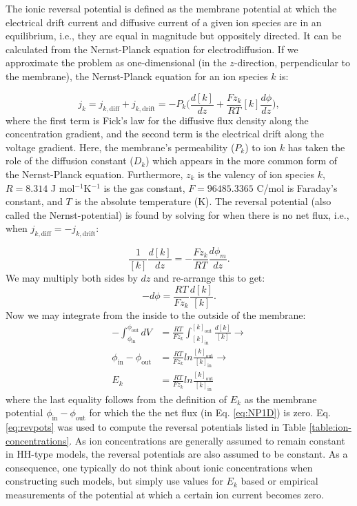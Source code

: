 The ionic reversal potential is defined as the membrane potential at which the electrical drift current and diffusive current of a given ion species are in an equilibrium, i.e., they are equal in magnitude but oppositely directed. It can be calculated from the Nernst-Planck equation for electrodiffusion. If we approximate the problem as one-dimensional (in the $z$-direction, perpendicular to the membrane), the Nernst-Planck equation for an ion species $k$ is:

\begin{equation}
j_k = j_{k,\text{diff}} + j_{k,\text{drift}} 
=  - P_k \Big(\frac{d[k]}{dz} +  \frac{Fz_k}{RT}  [k] \frac{d\phi}{dz} \Big), 
\label{eq:NP1D}
\end{equation}
where the first term is Fick's law for the diffusive flux density along the concentration gradient, and the second term is the electrical drift along the voltage gradient. Here, the membrane's permeability ($P_k$) to ion $k$ has taken the role of the diffusion constant ($D_k$) which appears in the more common form of the Nernst-Planck equation. Furthermore, $z_{k}$ is the valency of ion species $k$, $R = 8.314$ J mol$^{-1}$K$^{-1}$ is the gas constant, $F = 96485.3365$ C/mol is Faraday's constant, and $T$ is the absolute temperature (K). The reversal potential (also called the Nernst-potential) is found by solving for when there is no net flux, i.e., when  $j_{k,\text{diff}} = - j_{k,\text{drift}}$:

\begin{equation}
\frac{1}{[k]} \frac{d[k]}{dz} = - \frac{Fz_k}{RT}  \frac{d\phi_m}{dz}.
\end{equation}
We may multiply both sides by $dz$ and re-arrange this to get:
\begin{equation}
-d\phi = \frac{RT}{Fz_k}  \frac{d[k]}{[k]}.
\end{equation}
Now we may integrate from the inside to the outside of the membrane:
\begin{align}
-\int_{\phi_{\text{in}}}^{\phi_{\text{out}}}  dV &= \frac{RT}{Fz_k}  \int_{[k]_{\text{in}}}^{[k]_{\text{out}}} \frac{d[k]}{[k]} \rightarrow \\
\phi_{\text{in}}-\phi_{\text{out}} &= \frac{RT}{Fz_k} ln \frac{[k]_{\text{out}}} {[k]_{\text{in}}} \rightarrow \\
E_k & =  \frac{RT}{Fz_k}  ln \frac{[k]_{\text{out}}} {[k]_{\text{in}}} 
\label{eq:revpots}
\end{align}
where the last equality follows from the definition of $E_k$ as the membrane potential $\phi_{\text{in}}-\phi_{\text{out}}$ for which the the net flux (in Eq. \ref{eq:NP1D}) is zero. Eq. \ref{eq:revpots} was used to compute the reversal potentials listed in Table \ref{table:ion-concentrations}. As ion concentrations are generally assumed to remain constant in HH-type models, the reversal potentials are also assumed to be constant. As a consequence, one typically do not think about ionic concentrations when constructing such models, but simply use values for $E_k$ based or empirical measurements of the potential at which a certain ion current becomes zero.

